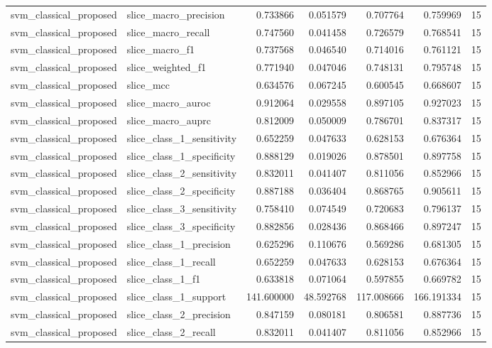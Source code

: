 \begin{tabular}{llrrrrr}
svm_classical_proposed & slice_macro_precision & 0.733866 & 0.051579 & 0.707764 & 0.759969 & 15 \\
svm_classical_proposed & slice_macro_recall & 0.747560 & 0.041458 & 0.726579 & 0.768541 & 15 \\
svm_classical_proposed & slice_macro_f1 & 0.737568 & 0.046540 & 0.714016 & 0.761121 & 15 \\
svm_classical_proposed & slice_weighted_f1 & 0.771940 & 0.047046 & 0.748131 & 0.795748 & 15 \\
svm_classical_proposed & slice_mcc & 0.634576 & 0.067245 & 0.600545 & 0.668607 & 15 \\
svm_classical_proposed & slice_macro_auroc & 0.912064 & 0.029558 & 0.897105 & 0.927023 & 15 \\
svm_classical_proposed & slice_macro_auprc & 0.812009 & 0.050009 & 0.786701 & 0.837317 & 15 \\
svm_classical_proposed & slice_class_1_sensitivity & 0.652259 & 0.047633 & 0.628153 & 0.676364 & 15 \\
svm_classical_proposed & slice_class_1_specificity & 0.888129 & 0.019026 & 0.878501 & 0.897758 & 15 \\
svm_classical_proposed & slice_class_2_sensitivity & 0.832011 & 0.041407 & 0.811056 & 0.852966 & 15 \\
svm_classical_proposed & slice_class_2_specificity & 0.887188 & 0.036404 & 0.868765 & 0.905611 & 15 \\
svm_classical_proposed & slice_class_3_sensitivity & 0.758410 & 0.074549 & 0.720683 & 0.796137 & 15 \\
svm_classical_proposed & slice_class_3_specificity & 0.882856 & 0.028436 & 0.868466 & 0.897247 & 15 \\
svm_classical_proposed & slice_class_1_precision & 0.625296 & 0.110676 & 0.569286 & 0.681305 & 15 \\
svm_classical_proposed & slice_class_1_recall & 0.652259 & 0.047633 & 0.628153 & 0.676364 & 15 \\
svm_classical_proposed & slice_class_1_f1 & 0.633818 & 0.071064 & 0.597855 & 0.669782 & 15 \\
svm_classical_proposed & slice_class_1_support & 141.600000 & 48.592768 & 117.008666 & 166.191334 & 15 \\
svm_classical_proposed & slice_class_2_precision & 0.847159 & 0.080181 & 0.806581 & 0.887736 & 15 \\
svm_classical_proposed & slice_class_2_recall & 0.832011 & 0.041407 & 0.811056 & 0.852966 & 15 \\

\end{tabular}
